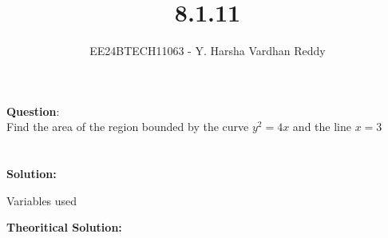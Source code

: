\documentclass[journal]{IEEEtran}
\begin{document}

\vspace{3cm}

\title{8.1.11}
\author{EE24BTECH11063 - Y. Harsha Vardhan Reddy}
 \maketitle
{\let\newpage\relax\maketitle}

\renewcommand{\thefigure}{\theenumi}
\renewcommand{\thetable}{\theenumi}
\setlength{\intextsep}{10pt} %


\renewcommand{\thetable}{\theenumi}

\textbf{Question}:\\
Find the area of the region bounded by the curve $y^2=4x$ and the line $x=3$\\
\\ \\
\textbf{Solution:}\\
\begin{table}[H]
    \centering
    
    \caption{Variables used}
    \label{tab1-1.2-20}
\end{table}
\textbf{Theoritical Solution: }
\end{document}
